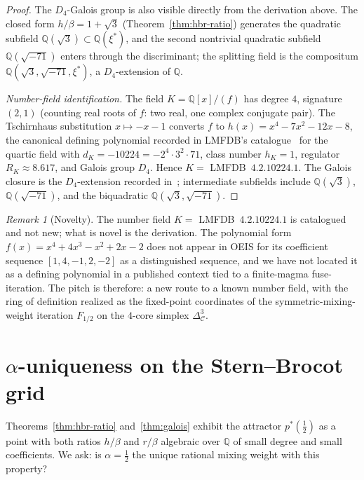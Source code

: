 \documentclass[11pt,reqno]{amsart}
\theoremstyle{plain}
\theoremstyle{definition}
\theoremstyle{remark}
\newtheorem*{remark}{Remark}
\newcommand{\Q}{\mathbb{Q}}
\newcommand{\Cfour}{\mathcal{C}}
\begin{document}
\begin{proof}
The $D_{4}$-Galois group is also visible directly from the
derivation above. The closed form $h/\beta = 1+\sqrt{3}$
(Theorem~\ref{thm:hbr-ratio}) generates the quadratic subfield
$\Q(\sqrt{3})\subset\Q(\xi^*)$, and the second nontrivial
quadratic subfield $\Q(\sqrt{-71})$ enters through the
discriminant; the splitting field is the compositum
$\Q(\sqrt{3}, \sqrt{-71}, \xi^*)$, a $D_{4}$-extension of $\Q$.

\textit{Number-field identification.} The field $K = \Q[x]/(f)$
has degree $4$, signature $(2, 1)$ (counting real roots of $f$:
two real, one complex conjugate pair).
The Tschirnhaus substitution $x \mapsto -x - 1$ converts $f$ to
$h(x) = x^{4} - 7x^{2} - 12x - 8$, the canonical defining
polynomial recorded in LMFDB's
catalogue~\cite{LMFDB-4-2-10224-1} for the
quartic field with $d_{K} = -10224 = -2^{4}\cdot 3^{2}\cdot 71$,
class number $h_{K} = 1$, regulator
$R_{K} \approx 8.617$, and Galois group $D_{4}$. Hence
$K = $ LMFDB~$4.2.10224.1$. The Galois closure is the
$D_{4}$-extension recorded
in~\cite{LMFDB-8-0-526936617216-1};
intermediate subfields include $\Q(\sqrt{3})$, $\Q(\sqrt{-71})$,
and the biquadratic $\Q(\sqrt{3}, \sqrt{-71})$.
\end{proof}

\begin{remark}[Novelty]\label{rem:novelty}
The number field $K = $ LMFDB~$4.2.10224.1$ is catalogued and
not new; what is novel is the derivation. The polynomial form
$f(x) = x^{4} + 4x^{3} - x^{2} + 2x - 2$ does not appear in
OEIS for its coefficient sequence $[1, 4, -1, 2, -2]$ as a
distinguished sequence, and we have not located it as a defining
polynomial in a published context tied to a finite-magma
fuse-iteration. The pitch is therefore: a new route to a known
number field, with the ring of definition realized as the
fixed-point coordinates of the symmetric-mixing-weight iteration
$F_{1/2}$ on the $4$-core simplex $\Delta^{3}_{\Cfour}$.
\end{remark}

\section{$\alpha$-uniqueness on the Stern--Brocot grid}\label{sec:alpha-unique}

Theorems~\ref{thm:hbr-ratio} and~\ref{thm:galois} exhibit the
attractor $p^*(\tfrac12)$ as a point with both ratios
$h/\beta$ and $r/\beta$ algebraic over $\Q$ of small degree and
small coefficients. We ask: is $\alpha = \tfrac12$ the unique
rational mixing weight with this property?
\end{document}
